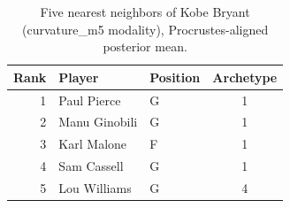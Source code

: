 \begin{table}[htbp]
  \centering\small
  \begin{tabular}{rllc}
    \toprule
    Rank & Player & Position & Archetype \\
    \midrule
    1 & Paul Pierce & G & 1 \\
    2 & Manu Ginobili & G & 1 \\
    3 & Karl Malone & F & 1 \\
    4 & Sam Cassell & G & 1 \\
    5 & Lou Williams & G & 4 \\
    \bottomrule
  \end{tabular}
  \caption{Five nearest neighbors of Kobe Bryant (curvature_m5 modality), Procrustes-aligned posterior mean.}
  \label{tab:Kobe_Bryant_neighbors_curvature_m5}
\end{table}

